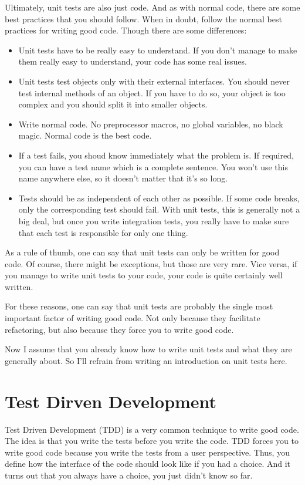 Ultimately, unit tests are also just code. And as with normal code, there are some best practices that you should follow. When in doubt, follow the normal best practices for writing good code. Though there are some differences:
\begin{itemize}
    \item Unit tests have to be really easy to understand. If you don't manage to make them really easy to understand, your code has some real issues.
    \item Unit tests test objects only with their external interfaces. You should never test internal methods of an object. If you have to do so, your object is too complex and you should split it into smaller objects.
    \item Write normal code. No preprocessor macros, no global variables, no black magic. Normal code is the best code.
    \item If a test fails, you shoud know immediately what the problem is. If required, you can have a test name which is a complete sentence. You won't use this name anywhere else, so it doesn't matter that it's so long.
    \item Tests should be as independent of each other as possible. If some code breaks, only the corresponding test should fail. With unit tests, this is generally not a big deal, but once you write integration tests, you really have to make sure that each test is responsible for only one thing.
\end{itemize}

As a rule of thumb, one can say that unit tests can only be written for good code. Of course, there might be exceptions, but those are very rare. Vice versa, if you manage to write unit tests to your code, your code is quite certainly well written.

For these reasons, one can say that unit tests are probably the single most important factor of writing good code. Not only because they facilitate refactoring, but also because they force you to write good code.

Now I assume that you already know how to write unit tests and what they are generally about. So I'll refrain from writing an introduction on unit tests here. 

\section{Test Dirven Development}\label{chap:tdd}

Test Driven Development (TDD) is a very common technique to write good code. The idea is that you write the tests before you write the code. TDD forces you to write good code because you write the tests from a user perspective. Thus, you define how the interface of the code should look like if you had a choice. And it turns out that you always have a choice, you just didn't know so far.

